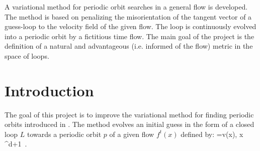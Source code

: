 


% 
% 
% 
% 
% 				
% 
 A variational method for periodic orbit searches in a general flow is developed.
 The method is based on penalizing the misorientation of the tangent vector of a guess-loop to
 the velocity field of the given flow. The loop is continuously evolved into a periodic orbit 
 by a fictitious time flow. The main goal of the project is the definition of a natural and 
 advantageous (i.e. informed of the flow) metric in the space of loops.

% 

\section{Introduction}

 The goal of this project is to improve the variational method
 for finding periodic orbits introduced in .
 The method evolves an initial guess in the form of a closed loop $L$
 towards a periodic orbit $p$ of a given flow $f^t(x)$ defined by:
 \beq
    =v(x),\; x \in {}^{d+1}\, .
    \label{eq:flow}
 \eeq


